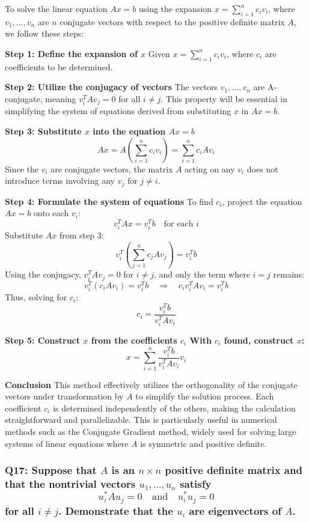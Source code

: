 \documentclass[8pt]{article}
\begin{document}
To solve the linear equation \(Ax = b\) using the expansion \(x = \sum_{i=1}^n c_i v_i\), where \(v_1, \ldots, v_n\) are \(n\) conjugate vectors with respect to the positive definite matrix \(A\), we follow these steps:

\textbf{Step 1: Define the expansion of \(x\)}
Given \(x = \sum_{i=1}^n c_i v_i\), where \(c_i\) are coefficients to be determined.

\textbf{Step 2: Utilize the conjugacy of vectors}
The vectors \(v_1, \ldots, v_n\) are A-conjugate, meaning \(v_i^T A v_j = 0\) for all \(i \neq j\). This property will be essential in simplifying the system of equations derived from substituting \(x\) in \(Ax = b\).

\textbf{Step 3: Substitute \(x\) into the equation \(Ax = b\)}
\[
Ax = A\left(\sum_{i=1}^n c_i v_i\right) = \sum_{i=1}^n c_i Av_i
\]
Since the \(v_i\) are conjugate vectors, the matrix \(A\) acting on any \(v_i\) does not introduce terms involving any \(v_j\) for \(j \neq i\).

\textbf{Step 4: Formulate the system of equations}
To find \(c_i\), project the equation \(Ax = b\) onto each \(v_i\):
\[
v_i^T Ax = v_i^T b \quad \text{for each } i
\]
Substitute \(Ax\) from step 3:
\[
v_i^T \left(\sum_{j=1}^n c_j Av_j\right) = v_i^T b
\]
Using the conjugacy, \(v_i^T Av_j = 0\) for \(i \neq j\), and only the term where \(i = j\) remains:
\[
v_i^T (c_i Av_i) = v_i^T b \quad \Rightarrow \quad c_i v_i^T Av_i = v_i^T b
\]
Thus, solving for \(c_i\):
\[
c_i = \frac{v_i^T b}{v_i^T Av_i}
\]

\textbf{Step 5: Construct \(x\) from the coefficients \(c_i\)
With \(c_i\) found, construct \(x\):}
\[
x = \sum_{i=1}^n \frac{v_i^T b}{v_i^T Av_i} v_i
\]

\textbf{Conclusion}
This method effectively utilizes the orthogonality of the conjugate vectors under transformation by \(A\) to simplify the solution process. Each coefficient \(c_i\) is determined independently of the others, making the calculation straightforward and parallelizable. This is particularly useful in numerical methods such as the Conjugate Gradient method, widely used for solving large systems of linear equations where \(A\) is symmetric and positive definite.

\subsubsection*{Q17: Suppose that \(A\) is an \(n \times n\) positive definite matrix and that the nontrivial vectors \(u_1, \ldots, u_n\) satisfy
\[ u_i^* A u_j = 0 \quad \text{and} \quad u_i^* u_j = 0 \]
for all \(i \neq j\). Demonstrate that the \(u_i\) are eigenvectors of \(A\).}
\end{document}
